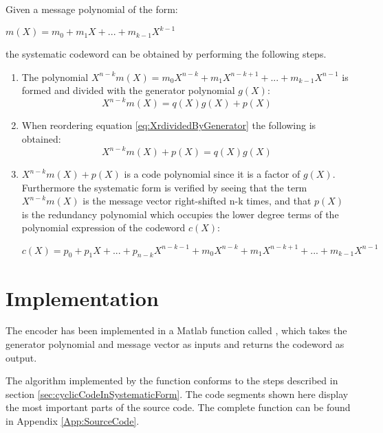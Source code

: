 \documentclass[Main]{subfiles}
\begin{document}
Given a message polynomial of the form:

{\centering 
$m(X) = m_0 + m_1X + ... + m_{k-1}X^{k-1}$ \par}

the systematic codeword can be obtained by performing the following steps.

\begin{enumerate}
\item The polynomial $X^{n-k}m(X) = m_0X^{n-k} + m_1X^{n-k+1} + ... +m_{k-1}X^{n-1}$ is formed and divided with the generator polynomial $g(X)$:
\begin{equation} \label{eq:XrdividedByGenerator}
X^{n-k}m(X) = q(X)g(X)+p(X)
\end{equation}

\item When reordering equation \ref{eq:XrdividedByGenerator} the following is obtained:
\begin{equation} \label{eq:XrdividedByGeneratorReoreded}
X^{n-k}m(X)+ p(X)=q(X)g(X)
\end{equation}

\item $X^{n-k}m(X)+p(X)$ is a code polynomial since it is a factor of $g(X)$. Furthermore the systematic form is verified by seeing that the term $X^{n-k}m(X)$ is the message vector right-shifted n-k times, and that $p(X)$ is the redundancy polynomial which occupies the lower degree terms of the polynomial expression of the codeword $c(X)$:

{\centering 
$c(X) = p_0 + p_1X + ... + p_{n-k}X^{n-k-1} + m_0X^{n-k} + m_1X^{n-k+1}+...+m_{k-1}X^{n-1}$ \par}

\end{enumerate}

\section{Implementation}
The encoder has been implemented in a Matlab function called  , which takes the generator polynomial and message vector as inputs and returns the codeword as output.

The algorithm implemented by the function conforms to the steps described in section \ref{sec:cyclicCodeInSystematicForm}. The code segments shown here display the most important parts of the source code. The complete function can be found in Appendix \ref{App:SourceCode}. 
\end{document}
